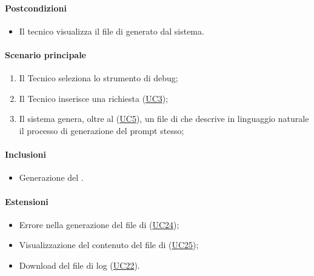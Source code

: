 \paragraph*{Postcondizioni}
\begin{itemize}
  \item Il tecnico visualizza il file di  generato dal sistema.
\end{itemize}

\paragraph*{Scenario principale}
\begin{enumerate}
  \item Il Tecnico seleziona lo strumento di debug;
  \item Il Tecnico inserisce una richiesta (\hyperref[UC3]{UC3});
  \item Il sistema genera, oltre al  (\hyperref[UC5]{UC5}), un file di  che descrive in linguaggio naturale il processo di generazione del prompt stesso; 
\end{enumerate}

\paragraph*{Inclusioni}
\begin{itemize}
  \item Generazione del .
\end{itemize}

\paragraph*{Estensioni}
\begin{itemize}
  \item Errore nella generazione del file di  (\hyperref[UC24]{UC24});
  \item Visualizzazione del contenuto del file di  (\hyperref[UC25]{UC25});
  \item Download del file di log (\hyperref[UC22]{UC22}).
\end{itemize}